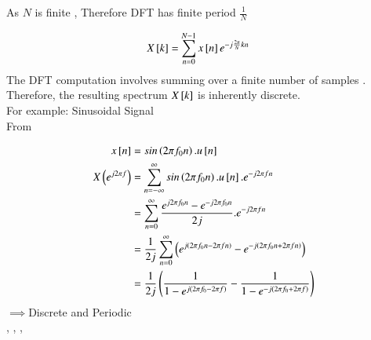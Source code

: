 \documentclass[journal,12pt,onecolumn]{IEEEtran}
\theoremstyle{remark}
\begin{document}
As $N$ is finite , Therefore DFT has finite period $\frac{1}{N}$

\begin{align}
X{}\left[k\right]&=\sum_{n=0}^{N-1}x{}\left[n\right]e^{-j\frac{2\pi}{N}kn}
\end{align}
The DFT computation involves summing over a finite number of samples . Therefore, the resulting spectrum  $X{}\left[k\right]$ is inherently discrete.\\

For example:  Sinusoidal Signal\\

From 

\begin{align}
x{}\left[n\right]&=sin\left(2\pi f_0n\right).u{}\left[n\right]\\
X\left(e^{j2\pi f}\right)&= \sum_{n=-\infty}^{\infty} sin\left(2\pi f_0n\right).u{}\left[n\right].e^{-j2\pi fn}\\
&= \sum_{n=0}^{\infty} \frac{e^{j2\pi f_0n}- e^{-j2\pi f_0n}}{2j}. e^{-j2\pi fn}\\
&=\frac{1}{2j}\sum_{n=0}^{\infty} \left(e^{j\left(2\pi f_0n-2\pi fn\right)} -  e^{-j\left(2\pi f_0n+2\pi fn\right)} \right)\\
&= \frac{1}{2j} \left(\frac{1}{1-e^{j\left(2\pi f_0-2\pi f\right)}}  -  \frac{1}{1-e^{-j\left(2\pi f_0+ 2\pi f\right)}}\right)
\end{align}
$\implies$Discrete and Periodic \\

 \textrightarrow {}   ,   \textrightarrow {}   ,    \textrightarrow {}   ,    \textrightarrow {}

\end{document}
